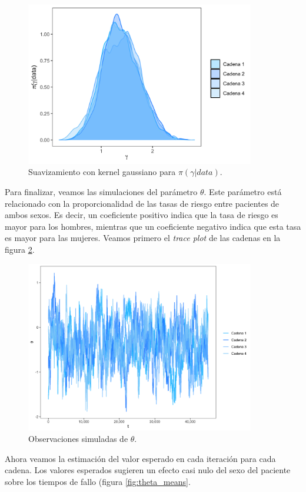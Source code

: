 \documentclass[11pt,a4paper]{article}
\begin{document}
\begin{figure}
\centering\includegraphics[width=10cm]{gamma_densities.png}
\caption{Suavizamiento con kernel gaussiano para $\pi (\gamma | data)$.}
\label{fig:gamma_densities}
\end{figure}

Para finalizar, veamos las simulaciones del parámetro $\theta$. Este parámetro está relacionado con la proporcionalidad de las tasas de riesgo entre pacientes de ambos sexos. Es decir, un coeficiente positivo indica que la tasa de riesgo es mayor para los hombres, mientras que un coeficiente negativo indica que esta tasa es mayor para las mujeres. Veamos primero el \textit{trace plot} de las cadenas en la figura \ref{fig:theta_trace}.\\

\begin{figure}
\centering\includegraphics[width=10cm]{theta_traceplot.png}
\caption{Observaciones simuladas de $\theta$.}
\label{fig:theta_trace}
\end{figure}

Ahora veamos la estimación del valor esperado en cada iteración para cada cadena. Los valores esperados sugieren un efecto casi nulo del sexo del paciente sobre los tiempos de fallo (figura \ref{fig:theta_means}.\\
\end{document}
